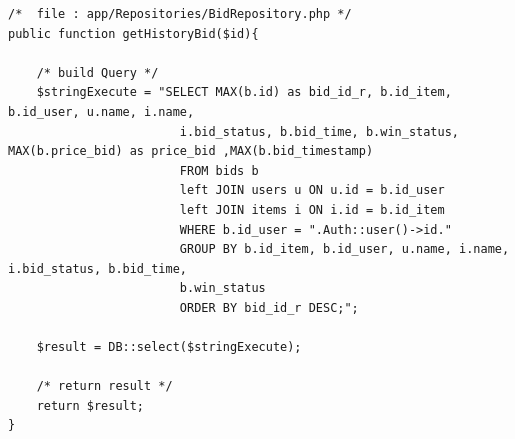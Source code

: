 \begin{lstlisting}[label=cdrep.02-04,style=php,caption=Kode Sumber \textit{Repository}: Melihat Riwayat Penawaran]
/*  file : app/Repositories/BidRepository.php */
public function getHistoryBid($id){

    /* build Query */
    $stringExecute = "SELECT MAX(b.id) as bid_id_r, b.id_item, b.id_user, u.name, i.name,
                        i.bid_status, b.bid_time, b.win_status, MAX(b.price_bid) as price_bid ,MAX(b.bid_timestamp)
                        FROM bids b
                        left JOIN users u ON u.id = b.id_user
                        left JOIN items i ON i.id = b.id_item
                        WHERE b.id_user = ".Auth::user()->id."
                        GROUP BY b.id_item, b.id_user, u.name, i.name, i.bid_status, b.bid_time,
                        b.win_status
                        ORDER BY bid_id_r DESC;";
    
    $result = DB::select($stringExecute);

    /* return result */
    return $result;
}
\end{lstlisting}


